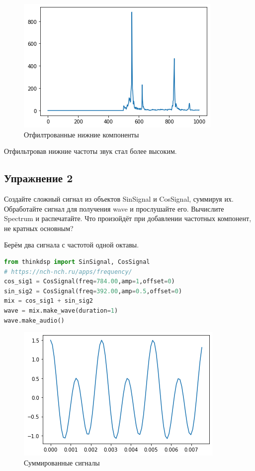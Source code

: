 \begin{figure}[H]
	\begin{center}
		\includegraphics[scale=1]{fig/lab01/lab01_28_0.png}
		\caption{Отфилтрованные нижние компоненты}
	\end{center}
\end{figure}

Отфильтровав нижние частоты звук стал более высоким.

\subsection{Упражнение 2}

Создайте сложный сигнал из объектов SinSignal и CosSignal, суммируя их. Обработайте сигнал для получения wave и прослушайте его. Вычислите Spectrum и распечатайте. Что произойдёт при добавлении частотных компонент, не кратных основным?


Берём два сигнала с частотой одной октавы.
\begin{lstlisting}[language=Python]
from thinkdsp import SinSignal, CosSignal
# https://nch-nch.ru/apps/frequency/
cos_sig1 = CosSignal(freq=784.00,amp=1,offset=0)
sin_sig2 = CosSignal(freq=392.00,amp=0.5,offset=0)
mix = cos_sig1 + sin_sig2
wave = mix.make_wave(duration=1)
wave.make_audio()
\end{lstlisting}

\begin{figure}[H]
	\begin{center}
		\includegraphics[scale=1]{fig/lab01/lab01_34_0.png}
		\caption{Суммированные сигналы}
	\end{center}
\end{figure}

